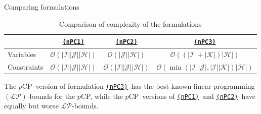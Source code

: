 \documentclass[utf8,aspectratio=169,ngerman,english]{beamer}
\newcommand{\nPC}{\hyperref[eq:nPC]{\texttt{(nPC1)}}}
\newcommand{\nPCE}{\hyperref[eq:nPCE]{\texttt{(nPC3)}}}
\newcommand{\nPCY}{\hyperref[eq:nPCY]{\texttt{(nPC2)}}}
\newcommand{\pCP}{$p$CP}
\begin{document}
\begin{frame}{Comparing formulations}
    \begin{table}[]
        \centering
        \caption{Comparison of complexity of the formulations}
        \label{tab:complexity}
            \begin{tabular}{l|ccc}
                \hline
                            & \nPC                                                      & \nPCY                                                         & \nPCE                                                                                          \\ \hline
                Variables   & $\mathcal O(| \mathcal I || \mathcal J || \mathcal H |)$  & $\mathcal O (| \mathcal J || \mathcal H |)$                   & $\mathcal O ((| \mathcal I | + | \mathcal K |) | \mathcal H |)$                               \\
                Constraints & $\mathcal O(| \mathcal I || \mathcal J || \mathcal H |)$  & $\mathcal O (| \mathcal I || \mathcal J || \mathcal H |)$     & $\mathcal O (\min(| \mathcal I || \mathcal J |,| \mathcal I || \mathcal K |)| \mathcal H |)$  \\ \hline
            \end{tabular}%
    \end{table}\pause
    The \pCP\ version of formulation \nPCE\ has the best known linear programming $(\mathcal{LP})$-bounds for the \pCP, 
    while the \pCP\ versions of \nPC\ and \nPCY\ have equally but worse $\mathcal{LP}$-bounds. 
\end{frame}
\end{document}
